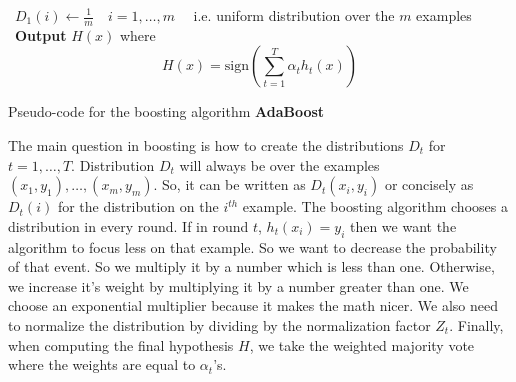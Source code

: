 \documentclass[10pt ]{article}
\begin{document}
\vspace{0.5cm}
\begin{algorithm}[H]
 \
 $D_1(i) \gets \frac{1}{m} \quad i=1,\dots,m \quad$ i.e. uniform distribution over the $m$ examples\;
 \
\textbf{Output} $H(x)$ where $$H(x) = \mathrm{sign} \left( \sum_{t=1}^T \alpha_t h_t(x) \right)$$
 \caption{Pseudo-code for the boosting algorithm \textbf{AdaBoost}}
 \label{alg_boosting}
\end{algorithm}
\vspace{0.5cm}
The main question in boosting is how to create the distributions $D_t$ for $t=1,\dots,T$. Distribution $D_t$ will always be over the examples $(x_1,y_1),\dots,(x_m,y_m)$. So, it can be written as $D_t(x_i, y_i)$ or concisely as $D_t(i)$ for the distribution on the $i^{th}$ example.  The boosting algorithm chooses a distribution in every round. If in round $t$, $h_t(x_i) = y_i$ then we want the algorithm to focus less on that example. So we want to decrease the probability of that event. So we multiply it by a number which is less than one. Otherwise, we increase it's weight by multiplying it by a number greater than one. We choose an exponential multiplier because it makes the math nicer. We also need to normalize the distribution by dividing by the normalization factor $Z_t$. Finally, when computing the final hypothesis $H$, we take the weighted majority vote where the weights are equal to $\alpha_t$'s. 
\end{document}
